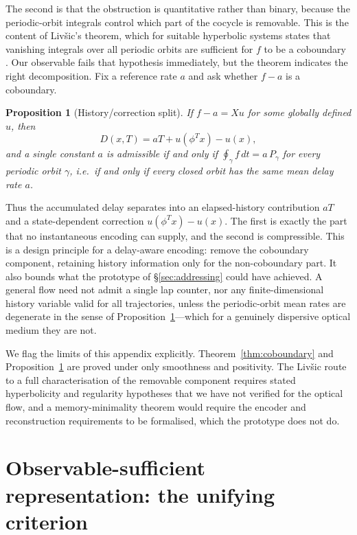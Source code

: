 \documentclass[11pt]{article}
\newtheorem{proposition}[theorem]{Proposition}
\begin{document}
The second is that the obstruction is quantitative rather than binary, because the
periodic-orbit integrals control which part of the cocycle is removable. This is the
content of Liv\v{s}ic's theorem, which for suitable hyperbolic systems states that
vanishing integrals over all periodic orbits are sufficient for $f$ to be a
coboundary \cite{livsic1972,katok1995}. Our observable fails that hypothesis immediately,
but the theorem indicates the right decomposition. Fix a reference rate $a$ and ask
whether $f-a$ is a coboundary.

\begin{proposition}[History/correction split]\label{prop:split}
If $f-a=Xu$ for some globally defined $u$, then
\begin{equation}
D(x,T)=aT+u(\phi^T x)-u(x),
\end{equation}
and a single constant $a$ is admissible if and only if
$\oint_\gamma f\,dt = a\,P_\gamma$ for every periodic orbit $\gamma$, i.e.\ if and only
if every closed orbit has the same mean delay rate $a$.
\end{proposition}

Thus the accumulated delay separates into an elapsed-history contribution $aT$ and a
state-dependent correction $u(\phi^T x)-u(x)$. The first is exactly the part that no
instantaneous encoding can supply, and the second is compressible. This is a design
principle for a delay-aware encoding: remove the coboundary component, retaining history
information only for the non-coboundary part. It also bounds what the prototype of
\S\ref{sec:addressing} could have achieved. A general flow need not admit a single lap
counter, nor any finite-dimensional history variable valid for all trajectories, unless
the periodic-orbit mean rates are degenerate in the sense of
Proposition~\ref{prop:split}---which for a genuinely dispersive optical medium they are
not.

We flag the limits of this appendix explicitly. Theorem~\ref{thm:coboundary} and
Proposition~\ref{prop:split} are proved under only smoothness and positivity. The
Liv\v{s}ic route to a full characterisation of the removable component requires stated
hyperbolicity and regularity hypotheses that we have not verified for the optical flow,
and a memory-minimality theorem would require the encoder and reconstruction requirements
to be formalised, which the prototype does not do.

\section{Observable-sufficient representation: the unifying criterion}\label{app:framework}
\end{document}
